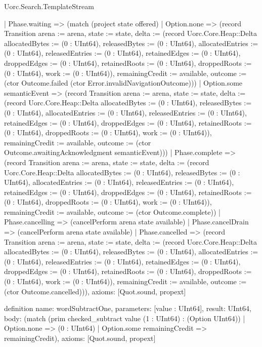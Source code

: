 \begin{lexlean}{Uorc.Search.TemplateStream}
\begin{semanticmodule}
{    | Phase.waiting => (match (project state offered)
      | Option.none => (record Transition {arena := arena, state := state, delta := (record Uorc.Core.Heap::Delta {allocatedBytes := (0 : UInt64), releasedBytes := (0 : UInt64), allocatedEntries := (0 : UInt64), releasedEntries := (0 : UInt64), retainedEdges := (0 : UInt64), droppedEdges := (0 : UInt64), retainedRoots := (0 : UInt64), droppedRoots := (0 : UInt64), work := (0 : UInt64)}), remainingCredit := available, outcome := (ctor Outcome.failed (ctor Error.invalidNavigationOutcome))})
      | Option.some semanticEvent => (record Transition {arena := arena, state := state, delta := (record Uorc.Core.Heap::Delta {allocatedBytes := (0 : UInt64), releasedBytes := (0 : UInt64), allocatedEntries := (0 : UInt64), releasedEntries := (0 : UInt64), retainedEdges := (0 : UInt64), droppedEdges := (0 : UInt64), retainedRoots := (0 : UInt64), droppedRoots := (0 : UInt64), work := (0 : UInt64)}), remainingCredit := available, outcome := (ctor Outcome.awaitingAcknowledgment semanticEvent)}))
    | Phase.complete => (record Transition {arena := arena, state := state, delta := (record Uorc.Core.Heap::Delta {allocatedBytes := (0 : UInt64), releasedBytes := (0 : UInt64), allocatedEntries := (0 : UInt64), releasedEntries := (0 : UInt64), retainedEdges := (0 : UInt64), droppedEdges := (0 : UInt64), retainedRoots := (0 : UInt64), droppedRoots := (0 : UInt64), work := (0 : UInt64)}), remainingCredit := available, outcome := (ctor Outcome.complete)})
    | Phase.cancelling => (cancelPerform arena state available)
    | Phase.cancelDrain => (cancelPerform arena state available)
    | Phase.cancelled => (record Transition {arena := arena, state := state, delta := (record Uorc.Core.Heap::Delta {allocatedBytes := (0 : UInt64), releasedBytes := (0 : UInt64), allocatedEntries := (0 : UInt64), releasedEntries := (0 : UInt64), retainedEdges := (0 : UInt64), droppedEdges := (0 : UInt64), retainedRoots := (0 : UInt64), droppedRoots := (0 : UInt64), work := (0 : UInt64)}), remainingCredit := available, outcome := (ctor Outcome.cancelled)})),
  axioms: [Quot.sound, propext]
}

definition{
  name: wordSubtractOne,
  parameters: [value : UInt64],
  result: UInt64,
  body: (match (prim checked_subtract value (1 : UInt64) : (Option UInt64))
    | Option.none => (0 : UInt64)
    | Option.some remainingCredit => remainingCredit),
  axioms: [Quot.sound, propext]
}


\end{semanticmodule}
\end{lexlean}
